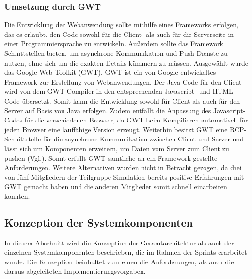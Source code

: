 \subsubsection{Umsetzung durch GWT}\label{GWT} 
Die Entwicklung der Webanwendung sollte mithilfe eines Frameworks erfolgen, das es erlaubt, den Code sowohl für die Client- als auch für die Serverseite in einer Programmiersprache zu entwickeln. Außerdem sollte das Framework Schnittstellen bieten, um asynchrone Kommunikation und Push-Dienste zu nutzen, ohne sich um die exakten Details kümmern zu müssen. Ausgewählt wurde das Google Web Toolkit (GWT). GWT ist ein von Google entwickeltes Framework zur Erstellung von Webanwendungen. Der Java-Code für den Client wird von dem GWT Compiler in den entsprechenden Javascript- und HTML-Code übersetzt. Somit kann die Entwicklung sowohl für Client als auch für den Server auf Basis von Java erfolgen. Zudem entfällt die Anpassung des Javascript-Codes für die verschiedenen Browser, da GWT beim Kompilieren automatisch für jeden Browser eine lauffähige Version erzeugt. Weiterhin besitzt GWT  eine RCP-Schnittstelle für die asynchrone Kommunikation zwischen Client und Server und lässt sich um Komponenten erweitern, um Daten vom Server zum Client zu pushen (Vgl.\cite{gwt}). Somit erfüllt GWT sämtliche an ein Framework gestellte Anforderungen. Weitere Alternativen wurden nicht in Betracht gezogen, da drei von fünf Mitgliedern der Teilgruppe Simulation bereits positive Erfahrungen mit GWT gemacht haben und die anderen Mitglieder somit schnell einarbeiten konnten. 
\subsection{Konzeption der Systemkomponenten}
In diesem Abschnitt wird die Konzeption der Gesamtarchitektur als auch der einzelnen Systemkomponenten beschrieben, die im Rahmen der Sprints erarbeitet wurde. Die Konzeption beinhaltet zum einen die Anforderungen, als auch die daraus abgeleiteten Implementierungsvorgaben.
\newpage
